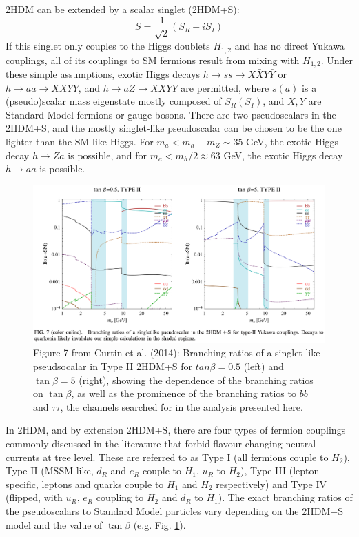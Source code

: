 \documentclass{article}
\begin{document}
2HDM can be extended by a scalar singlet (2HDM+S):
\begin{equation}
    S = \frac{1}{\sqrt{2}} (S_R + iS_I)
\end{equation}
If this singlet only couples to the Higgs doublets $H_{1,2}$ and has no direct Yukawa couplings, all of its couplings to SM fermions result from mixing with $H_{1,2}$. Under these simple assumptions, exotic Higgs decays $h\rightarrow ss \rightarrow X\bar{X}Y\bar{Y}$ or $h\rightarrow aa \rightarrow X\bar{X}Y\bar{Y}$, and $h \rightarrow aZ \rightarrow X\bar{X}Y\bar{Y}$ are permitted, where $s(a)$ is a (pseudo)scalar mass eigenstate mostly composed of $S_R (S_I)$, and $X, Y$ are Standard Model fermions or gauge bosons. There are two pseudoscalars in the 2HDM+S, and the mostly singlet-like pseudoscalar can be chosen to be the one lighter than the SM-like Higgs. For $m_a < m_h - m_Z \sim 35$ GeV, the exotic Higgs decay $h \rightarrow Za$ is possible, and for $m_a < m_h/2 \approx 63$ GeV, the exotic Higgs decay $h \rightarrow aa$ is possible. 

\begin{figure}[ht]
    \centering
    \includegraphics[width=15cm]{figures/curtin-2014-figure-7-BRs-of-singlelike-pseudoscalar-type-II.png}
    \caption{Figure 7 from Curtin et al. (2014): Branching ratios of a singlet-like pseudsocalar in Type II 2HDM+S for $tan\beta = 0.5$ (left) and $\tan\beta = 5$ (right), showing the dependence of the branching ratios on $\tan\beta$, as well as the prominence of the branching ratios to $bb$ and $\tau\tau$, the channels searched for in the analysis presented here.}
    \label{fig:curtin-2014-fig-4-typeI-BRs}
\end{figure}


In 2HDM, and by extension 2HDM+S, there are four types of fermion couplings commonly discussed in the literature that forbid flavour-changing neutral currents at tree level. These are referred to as Type I (all fermions couple to $H_2$), Type II (MSSM-like, $d_R$ and $e_R$ couple to $H_1$, $u_R$ to $H_2$), Type III (lepton-specific, leptons and quarks couple to $H_1$ and $H_2$ respectively) and Type IV (flipped, with $u_R$, $e_R$ coupling to $H_2$ and $d_R$ to $H_1$). The exact branching ratios of the pseudoscalars to Standard Model particles vary depending on the 2HDM+S model and the value of $\tan\beta$ (e.g. Fig. \ref{fig:curtin-2014-fig-4-typeI-BRs}).
\end{document}
